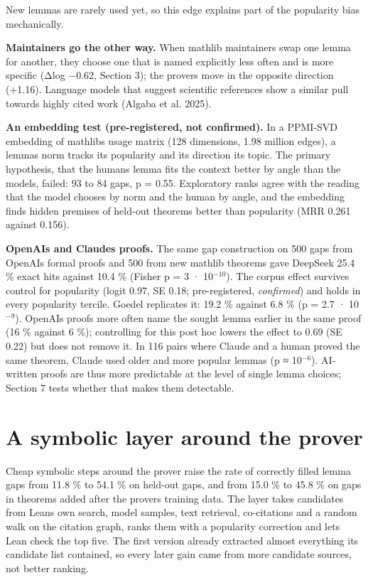 \documentclass[11pt,a4paper]{article}
\begin{document}
New lemmas are rarely used yet, so this edge explains part of the popularity bias mechanically.

\textbf{Maintainers go the other way.} When mathlib maintainers swap one lemma for another, they choose one that is named explicitly less often and is more specific (Δlog −0.62, Section 3); the provers move in the opposite direction (+1.16). Language models that suggest scientific references show a similar pull towards highly cited work (Algaba et al. 2025).

\textbf{An embedding test (pre-registered, not confirmed).} In a PPMI-SVD embedding of mathlib\textquotesingle s usage matrix (128 dimensions, 1.98 million edges), a lemma\textquotesingle s norm tracks its popularity and its direction its topic. The primary hypothesis, that the human\textquotesingle s lemma fits the context better by angle than the model\textquotesingle s, failed: 93 to 84 gaps, p = 0.55. Exploratory ranks agree with the reading that the model chooses by norm and the human by angle, and the embedding finds hidden premises of held-out theorems better than popularity (MRR 0.261 against 0.156).

\textbf{OpenAI\textquotesingle s and Claude\textquotesingle s proofs.} The same gap construction on 500 gaps from OpenAI\textquotesingle s formal proofs and 500 from new mathlib theorems gave DeepSeek 25.4 \% exact hits against 10.4 \% (Fisher p = 3 · 10\(^{-10}\)). The corpus effect survives control for popularity (logit 0.97, SE 0.18; pre-registered, \emph{confirmed}) and holds in every popularity tercile. Goedel replicates it: 19.2 \% against 6.8 \% (p = 2.7 · 10\(^{-9}\)). OpenAI\textquotesingle s proofs more often name the sought lemma earlier in the same proof (16 \% against 6 \%); controlling for this post hoc lowers the effect to 0.69 (SE 0.22) but does not remove it. In 116 pairs where Claude and a human proved the same theorem, Claude used older and more popular lemmas (p ≈ 10\(^{-6}\)). AI-written proofs are thus more predictable at the level of single lemma choices; Section 7 tests whether that makes them detectable.

\section{A symbolic layer around the prover}

Cheap symbolic steps around the prover raise the rate of correctly filled lemma gaps from 11.8 \% to 54.1 \% on held-out gaps, and from 15.0 \% to 45.8 \% on gaps in theorems added after the prover\textquotesingle s training data. The layer takes candidates from Lean\textquotesingle s own search, model samples, text retrieval, co-citations and a random walk on the citation graph, ranks them with a popularity correction and lets Lean check the top five. The first version already extracted almost everything its candidate list contained, so every later gain came from more candidate sources, not better ranking.
\end{document}
